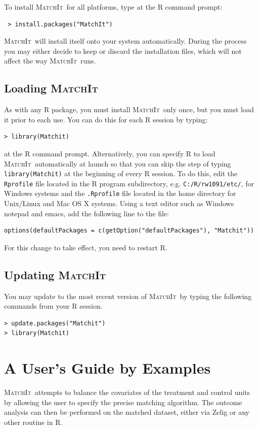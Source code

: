 \documentclass[oneside,letterpaper,titlepage]{article}
\newcommand{\MatchIt}{\textsc{MatchIt}}
\begin{document}
To install \MatchIt\ for all platforms, type at the R command prompt:
\begin{verbatim}
 > install.packages("MatchIt")
\end{verbatim}

  \noindent \MatchIt\ will install itself onto your system
  automatically.  During the process you may either decide to keep or
  discard the installation files, which will not affect the way
  \MatchIt\ runs.

\subsection{Loading \MatchIt}
As with any R package, you must install \MatchIt\ only once, but you
must load it prior to each use.  You can do this for each R session by
typing:
\begin{verbatim}
> library(Matchit) 
\end{verbatim}
at the R command prompt.  Alternatively, you can specify R to load
\MatchIt\ automatically at launch so that you can skip the step of
typing {\tt library(Matchit)} at the beginning of every R session.  To
do this, edit the {\tt Rprofile} file located in the R program
subdirectory, e.g. \texttt{C:/R/rw1091/etc/}, for Windows systems and
the {\tt .Rprofile} file located in the home directory for Unix/Linux
and Mac OS X systems.  Using a text editor such as Windows notepad and
emacs, add the following line to the file:
\begin{verbatim}
options(defaultPackages = c(getOption("defaultPackages"), "Matchit"))
\end{verbatim}
For this change to take effect, you need to restart R.

\subsection{Updating \MatchIt}
You may update to the most recent version of \MatchIt\ by typing the
following commands from your R session.

\begin{small}
\begin{verbatim}
> update.packages("Matchit")
> library(Matchit) 
\end{verbatim}
\end{small} 

\section{A User's Guide by Examples}
\MatchIt\ attempts to balance the covariates of the treatment and
control units by allowing the user to specify the precise matching
algorithm.  The outcome analysis can then be performed on the matched
dataset, either via Zelig or any other routine in R.
\end{document}
